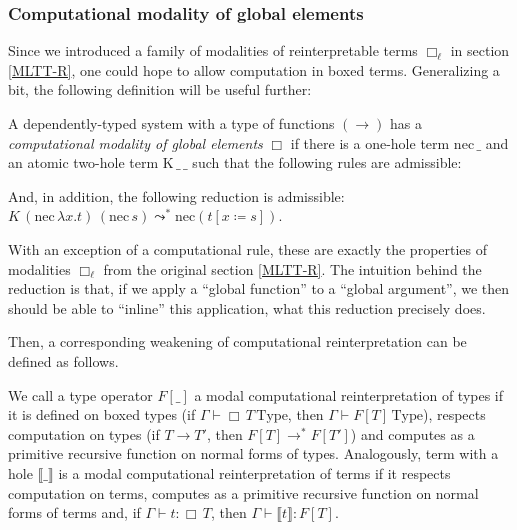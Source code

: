 \subsubsection{
    Computational modality of global elements}
\label{global-elements}

Since we introduced a family of modalities of
reinterpretable terms $\Box_\ell$ in section
\ref{MLTT-R}, one could hope to allow computation in
boxed terms. Generalizing a bit, the following
definition will be useful further:

\begin{definition}
    A dependently-typed system with a type of functions
    $(\to)$ has a \textit{computational modality of
    global elements} $\Box$ if there is a one-hole term
    $\mathrm{nec}\,\_$ and an atomic two-hole term
    $\mathrm{K}\,\_\,\_$ such that the following rules
    are admissible:
    And, in addition, the following reduction is
    admissible: $K\,(\mathrm{nec}\,\lambda x.t)\,
    (\mathrm{nec}\,s)\leadsto^*
    \mathrm{nec}(t[x\coloneqq s])$.
\end{definition}

With an exception of a computational rule, these are
exactly the properties of modalities $\Box_\ell$ from
the original section \ref{MLTT-R}. The intuition behind
the reduction is that, if we apply a ``global function''
to a ``global argument'', we then should be able to
``inline'' this application, what this reduction
precisely does.

Then, a corresponding weakening of computational
reinterpretation can be defined as follows.

\begin{definition}
    We call a type operator $F[\_]$ a modal
    computational reinterpretation of types if it is
    defined on boxed types (if
    $\Gamma\vdash\Box\,T\,\mathrm{Type}$, then
    $\Gamma\vdash F[T]\,\mathrm{Type}$), respects
    computation on types (if $T\to T'$, then
    $F[T]\to^* F[T']$) and computes as a primitive
    recursive function on normal forms of types.
    Analogously, term with a hole
    $\llbracket\_\rrbracket$ is a modal computational
    reinterpretation of terms if it respects computation
    on terms, computes as a primitive recursive
    function on normal forms of terms and, if
    $\Gamma\vdash t:\Box\,T$, then
    $\Gamma\vdash\llbracket t\rrbracket:F[T]$.
\end{definition}

